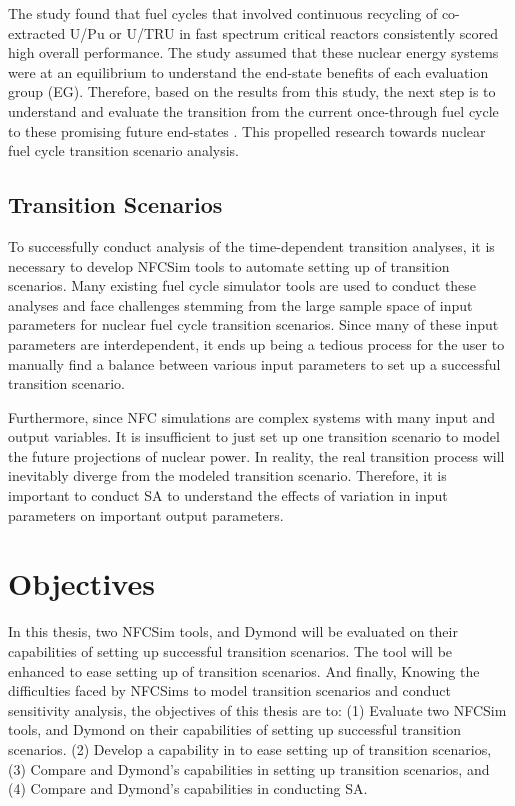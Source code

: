 The study found that fuel cycles that involved continuous recycling
of co-extracted U/Pu or U/TRU in fast spectrum critical reactors
consistently scored high overall performance. 
The study assumed that 
these nuclear energy systems were at an equilibrium to understand 
the end-state benefits of each evaluation group (EG). 
Therefore, based on the results from this study, the next step is 
to understand and evaluate the transition from the current 
once-through fuel cycle to these promising 
future end-states \cite{feng_standardized_2016}. 
This propelled research towards nuclear fuel cycle transition 
scenario analysis. 

\subsection{Transition Scenarios}
To successfully conduct analysis of the time-dependent transition
analyses, it is necessary to develop \gls{NFCSim} tools to  
automate setting up of transition scenarios. 
Many existing fuel cycle simulator tools are used to conduct 
these analyses and face challenges stemming from the large sample 
space of input 
parameters for nuclear fuel cycle transition scenarios.
Since many of these input parameters are interdependent, it ends
up being a tedious process for the user to manually find a balance 
between various input parameters to set up a successful transition 
scenario. 

Furthermore, since \gls{NFC} simulations are complex systems with 
many input and output variables. 
It is insufficient to just set up one transition scenario to model 
the future projections of nuclear power. 
In reality, the real transition process will 
inevitably diverge from the modeled transition scenario. 
Therefore, it is important to conduct \gls{SA} to understand 
the effects of variation in input parameters on 
important output parameters. 

\section{Objectives}
In this thesis, two \gls{NFCSim} tools, \Cyclus and 
Dymond will be evaluated on their capabilities of setting up 
successful transition scenarios. 
The \Cyclus tool will be enhanced to ease setting up of 
transition scenarios. 
And finally,   
Knowing the difficulties faced by \glspl{NFCSim} to model 
transition scenarios and conduct sensitivity analysis, 
the objectives of this thesis are to: 
(1) Evaluate two \gls{NFCSim} tools, \Cyclus and 
Dymond on their capabilities of setting up 
successful transition scenarios. 
(2) Develop a capability in \Cyclus to ease setting up of transition 
scenarios, 
(3) Compare \Cyclus and Dymond's capabilities in setting up 
transition scenarios, and 
(4) Compare \Cyclus and Dymond's capabilities in conducting \gls{SA}. 